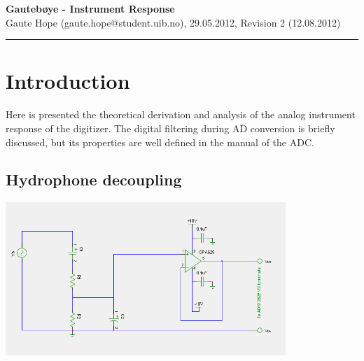 \documentclass[a4paper]{article}
\newcommand{\makeheading}[2]%
        {\hspace*{-\marginparsep minus \marginparwidth}%
         \begin{minipage}[t]{\textwidth\marginparwidth\marginparsep}%
           {\large \bfseries #1}\\{#2}\\[-0.15\baselineskip]%
                 \rule{\columnwidth}{1pt}%
         \end{minipage}}
\begin{document}
\makeheading{Gautebøye - Instrument Response}{Gaute Hope
(gaute.hope@student.uib.no), 29.05.2012, Revision 2 (12.08.2012)}

\vspace{2em}
\section*{Introduction} 
Here is presented the theoretical derivation and analysis of the analog
instrument response of the digitizer. The digital filtering during AD
conversion is briefly discussed, but its properties are well defined in
the manual of the ADC. \vspace{2em}

\begin{multicols}{2}
\section{Hydrophone decoupling}
\end{multicols}
\begin{center}
  \includegraphics[width=400px]{Hydrophone_decoupling.png}
  \label{fig:hydrophone_decoupling}
\end{center}
\end{document}
